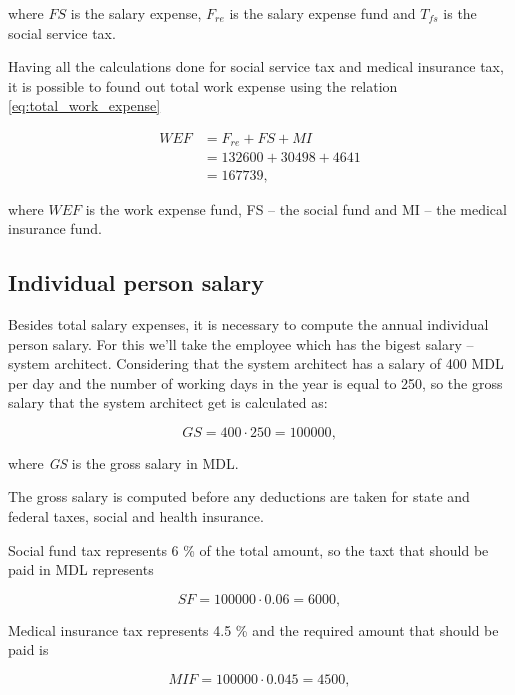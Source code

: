 \noindent
where $FS$ is the salary expense, $F_{re}$ is the salary expense fund and $T_{fs}$ is the social service tax.

Having all the calculations done for social service tax and medical insurance tax, it is possible to found out total work expense using the relation \eqref{eq:total_work_expense}

\begin{equation}\label{eq:total_work_expense}
\begin{split}
 WEF &= F_{re} + FS + MI\\
     &= 132600 + 30498 + 4641\\
     &= 167739,
\end{split}
\end{equation}

\noindent
where $WEF$ is the work expense fund, FS -- the social fund and MI -- the medical insurance fund.

\subsection{Individual person salary}

Besides total salary expenses, it is necessary to compute the annual individual person salary. For this we'll take the employee which has the bigest salary -- system architect. Considering that the system architect has a salary of 400 MDL per day and the number of working days in the year is equal to 250, so the gross salary that the system architect get is calculated as: 

\begin{equation} 
 GS = 400 \cdot 250 = 100000,
\end{equation}

\noindent
where \textit{GS} is the gross salary in MDL.

The gross salary is computed before any deductions are taken for state and federal taxes, social and health insurance. 

Social fund tax represents 6 \% of the total amount, so the taxt that should be paid in MDL represents

\begin{equation}
 SF = 100000 \cdot 0.06 = 6000,
\end{equation}

Medical insurance tax represents 4.5 \% and the required amount that should be paid is

\begin{equation}
 MIF = 100000 \cdot 0.045 = 4500,
\end{equation}


